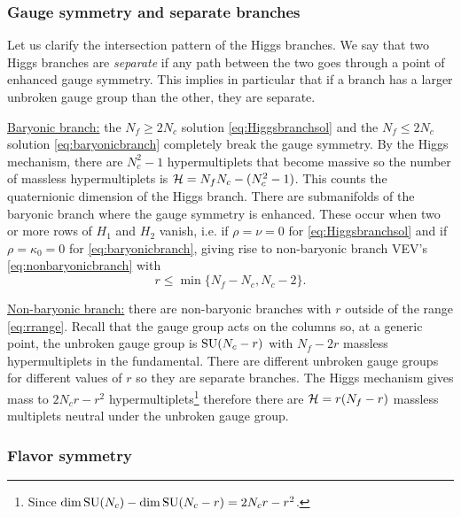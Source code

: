         \subsubsection{Gauge symmetry and separate branches}

            Let us clarify the intersection pattern of the Higgs branches. We say that two Higgs branches are \emph{separate} if any path between the two goes through a point of enhanced gauge symmetry. This implies in particular that if a branch has a larger unbroken gauge group than the other, they are separate.

            \underline{Baryonic branch:} the $N_f\geq2N_c$ solution \eqref{eq:Higgsbranchsol} and the $N_f\leq2N_c$ solution \eqref{eq:baryonicbranch} completely break the gauge symmetry. By the Higgs mechanism, there are $N^2_c-1$ hypermultiplets that become massive so the number of massless hypermultiplets is $\mathcal{H}=N_fN_c-(N^2_c-1)$. This counts the quaternionic dimension of the Higgs branch. There are submanifolds of the baryonic branch where the gauge symmetry is enhanced. These occur when two or more rows of $H_1$ and $H_2$ vanish, i.e. if $\rho=\nu=0$ for \eqref{eq:Higgsbranchsol} and if $\rho=\kappa_0=0$ for \eqref{eq:baryonicbranch}, giving rise to non-baryonic branch VEV's \eqref{eq:nonbaryonicbranch} with
            \begin{equation}
                r\leq \min\{N_f-N_c,N_c-2\}.\label{eq:rrange}
            \end{equation}

            \underline{Non-baryonic branch:} there are non-baryonic branches with $r$ outside of the range \eqref{eq:rrange}. Recall that the gauge group acts on the columns so, at a generic point, the unbroken gauge group is $\text{SU}(N_c-r)$ with $N_f-2r$ massless hypermultiplets in the fundamental. There are different unbroken gauge groups for different values of $r$ so they are separate branches. The Higgs mechanism gives mass to $2N_cr-r^2$ hypermultiplets\footnote{Since $\dim\text{SU}(N_c)-\dim\text{SU}(N_c-r)=2N_cr-r^2$.} therefore there are $\mathcal{H}=r(N_f-r)$ massless multiplets neutral under the unbroken gauge group.

        \subsubsection{Flavor symmetry}

